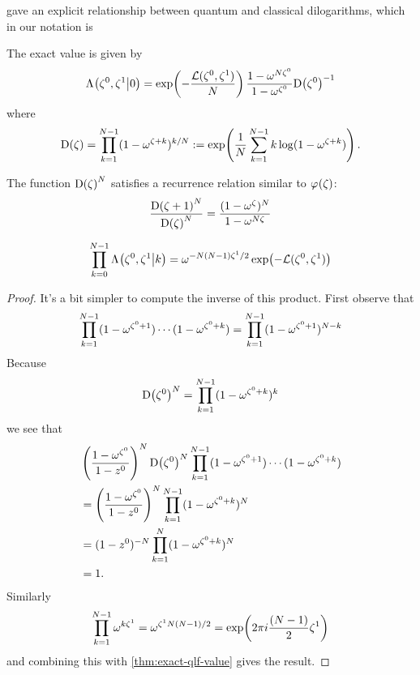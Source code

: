 \documentclass{sl2ams}
\numberwithin{equation}{section}
\begin{document}
\textcite{Garoufalidis2014} gave an explicit relationship between quantum and classical dilogarithms, which in our notation is
\begin{theorem}
  \label{thm:exact-qlf-value}
  The exact value is given by
  \begin{equation}
    \label{eq:exact-qlf-value}
    \qlf{\zeta^0, \zeta^1}{0}
    =
    \exp\leftfun(
    - \frac{\dilr(\zeta^0, \zeta^1)}{ \nr}
    \rightfun)
    \frac{1 - \omega^{\nr \zeta^0}}{1 - \omega^{\zeta^0}}
    \df{\zeta^0}^{-1}
  \end{equation}
  where
  \begin{equation}
    \label{eq:D-def}
    \df{\zeta}
    = \prod_{k=1}^{\nr -1} (1 - \omega^{\zeta + k})^{k/\nr}
    \defeq
    \exp \leftfun( \frac{1}{\nr} \sum_{k=1}^{\nr-1} k \log(1 - \omega^{\zeta + k}) \rightfun)
    .
  \end{equation}
\end{theorem}
The function \(\df{\zeta}^{\nr}\) satisfies a recurrence relation similar to \(\pf{\zeta}\):
\begin{equation}
  \label{eq:D-recurrence}
  \frac{
    \df{\zeta+1}^{\nr}
    }{
    \df{\zeta}^{\nr}
  }
  =
  \frac{
    (1 - \omega^{\zeta})^{\nr}
    }{
    1 - \omega^{\nr \zeta}
  }
\end{equation}

\begin{lemma}
  \label{thm:qlf-product}
  \begin{equation}
    \label{eq:qlf-product}
    \prod_{k=0}^{\nr -1} \qlf{\zeta^0, \zeta^1}{k}
    =
    \omega^{-\nr(\nr-1) \zeta^1/2}
    \exp
    \leftfun(
    - \dilr(\zeta^0, \zeta^1)
    \rightfun)
  \end{equation}
\end{lemma}
\begin{proof}
  It's a bit simpler to compute the inverse of this product.
  First observe that
  \[
    \prod_{k=1}^{N-1} (1 - \omega^{\zeta^0 + 1})\cdots(1 - \omega^{\zeta^0 + k})
    =
    \prod_{k=1}^{N-1} (1 - \omega^{\zeta^0 + 1})^{N - k}
  \]
  Because
  \[
    \df{\zeta^0}^{\nr}
    =
    \prod_{k=1}^{\nr-1} (1 - \omega^{\zeta^0 + k})^{k}
  \]
  we see that
  \begin{align*}
    &\left( \frac{1 - \omega^{\zeta^0} }{1 - z^0} \right)^{\nr}
    \df{\zeta^0}^{\nr}
    \prod_{k=1}^{\nr-1} (1 - \omega^{\zeta^0 + 1})\cdots(1 - \omega^{\zeta^0 + k})
    \\
    &=
    \left( \frac{1 - \omega^{\zeta^0} }{1 - z^0} \right)^{\nr}
    \prod_{k=1}^{\nr-1} (1 - \omega^{\zeta^0 + k})^{\nr}
    \\
    &=
    (1 - z^0)^{-\nr}
    \prod_{k=1}^{\nr} (1 - \omega^{\zeta^0 + k})^{\nr}
    \\
    &=
    1.
  \end{align*}
  Similarly
  \[
    \prod_{k=1}^{N -1} \omega^{k \zeta^1}
    =
    \omega^{\zeta^1N(N-1)/2}
    =
    \exp\mathopen{}\left( 2 \pi i \frac{(N -1)}{2}  \zeta^1 \right)
  \]
  and combining this with \cref{thm:exact-qlf-value} gives the result.
\end{proof}
\end{document}
